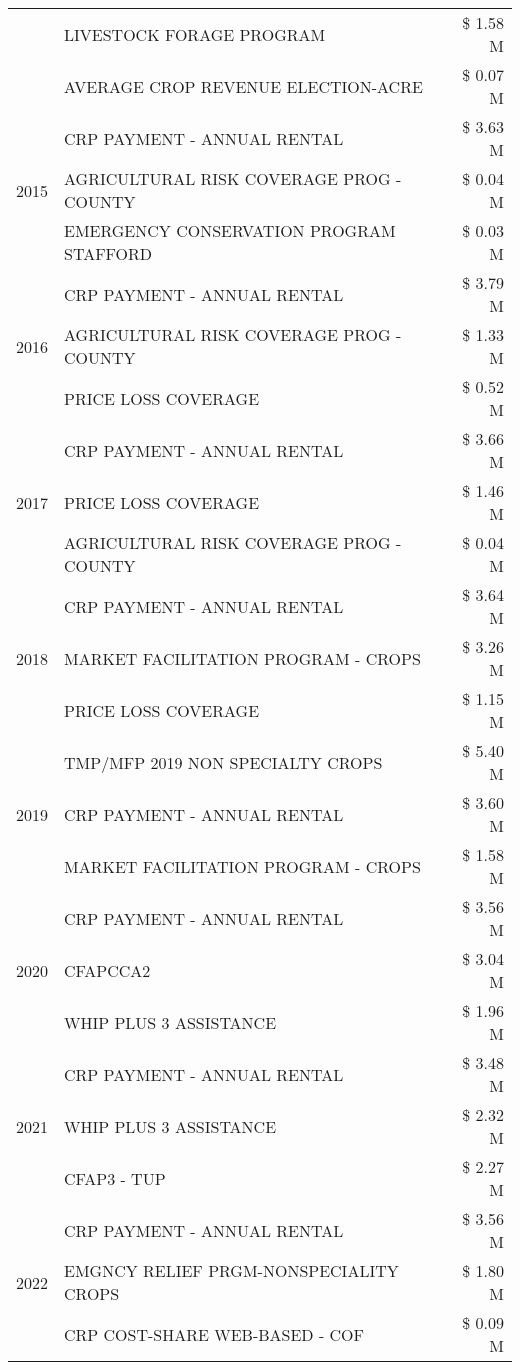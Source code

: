 \begin{tabular}{llr}
 & LIVESTOCK FORAGE PROGRAM & \$ 1.58 M \\
 & AVERAGE CROP REVENUE ELECTION-ACRE & \$ 0.07 M \\
\cline{1-3}
\multirow[t]{3}{*}{2015} & CRP PAYMENT - ANNUAL RENTAL & \$ 3.63 M \\
 & AGRICULTURAL RISK COVERAGE PROG - COUNTY & \$ 0.04 M \\
 & EMERGENCY CONSERVATION PROGRAM STAFFORD & \$ 0.03 M \\
\cline{1-3}
\multirow[t]{3}{*}{2016} & CRP PAYMENT - ANNUAL RENTAL & \$ 3.79 M \\
 & AGRICULTURAL RISK COVERAGE PROG - COUNTY & \$ 1.33 M \\
 & PRICE LOSS COVERAGE & \$ 0.52 M \\
\cline{1-3}
\multirow[t]{3}{*}{2017} & CRP PAYMENT - ANNUAL RENTAL & \$ 3.66 M \\
 & PRICE LOSS COVERAGE & \$ 1.46 M \\
 & AGRICULTURAL RISK COVERAGE PROG - COUNTY & \$ 0.04 M \\
\cline{1-3}
\multirow[t]{3}{*}{2018} & CRP PAYMENT - ANNUAL RENTAL & \$ 3.64 M \\
 & MARKET FACILITATION PROGRAM - CROPS & \$ 3.26 M \\
 & PRICE LOSS COVERAGE & \$ 1.15 M \\
\cline{1-3}
\multirow[t]{3}{*}{2019} & TMP/MFP 2019 NON SPECIALTY CROPS & \$ 5.40 M \\
 & CRP PAYMENT - ANNUAL RENTAL & \$ 3.60 M \\
 & MARKET FACILITATION PROGRAM - CROPS & \$ 1.58 M \\
\cline{1-3}
\multirow[t]{3}{*}{2020} & CRP PAYMENT - ANNUAL RENTAL & \$ 3.56 M \\
 & CFAPCCA2 & \$ 3.04 M \\
 & WHIP PLUS 3 ASSISTANCE & \$ 1.96 M \\
\cline{1-3}
\multirow[t]{3}{*}{2021} & CRP PAYMENT - ANNUAL RENTAL & \$ 3.48 M \\
 & WHIP PLUS 3 ASSISTANCE & \$ 2.32 M \\
 & CFAP3 - TUP & \$ 2.27 M \\
\cline{1-3}
\multirow[t]{3}{*}{2022} & CRP PAYMENT - ANNUAL RENTAL & \$ 3.56 M \\
 & EMGNCY RELIEF PRGM-NONSPECIALITY CROPS & \$ 1.80 M \\
 & CRP COST-SHARE WEB-BASED - COF & \$ 0.09 M \\
\cline{1-3}
\bottomrule
\end{tabular}
